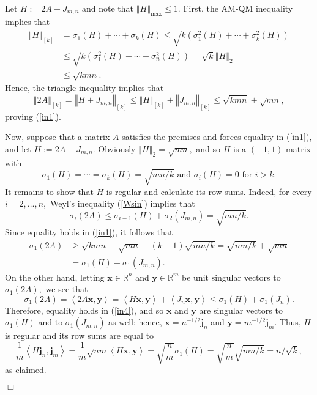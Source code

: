 \documentclass[12pt]{article}%
\newenvironment{proof}[1][Proof]{\noindent{\textbf {#1}  }}  {\hfill$\Box$\bigskip}
\begin{document}
\begin{proof}
Let $H:=2A-J_{m,n}$ and note that $\left\Vert H\right\Vert _{\max}\leq1$.
First, the AM-QM inequality implies that
\begin{align*}
\left\Vert H\right\Vert _{\left[  k\right]  }  &  =\sigma_{1}\left(  H\right)
+\cdots+\sigma_{k}\left(  H\right)  \leq\sqrt{k\left(  \sigma_{1}^{2}\left(
H\right)  +\cdots+\sigma_{k}^{2}\left(  H\right)  \right)  }\\
&  \leq\sqrt{k\left(  \sigma_{1}^{2}\left(  H\right)  +\cdots+\sigma_{n}%
^{2}\left(  H\right)  \right)  }=\sqrt{k}\left\Vert H\right\Vert _{2}\\
&  \leq\sqrt{kmn}.
\end{align*}
Hence, the triangle inequality implies that%
\[
\left\Vert 2A\right\Vert _{\left[  k\right]  }=\left\Vert H+J_{m,n}\right\Vert
_{\left[  k\right]  }\leq\left\Vert H\right\Vert _{\left[  k\right]
}+\left\Vert J_{m,n}\right\Vert _{\left[  k\right]  }\leq\sqrt{kmn}+\sqrt
{mn},
\]
proving (\ref{in1}).

Now, suppose that a matrix $A$ satisfies the premises and forces equality in
(\ref{in1}), and let $H:=2A-J_{m,n}.$ Obviously $\left\Vert H\right\Vert
_{2}=\sqrt{mn},$ and so $H$ is a $\left(  -1,1\right)  $-matrix with
\[
\sigma_{1}\left(  H\right)  =\cdots=\sigma_{k}\left(  H\right)  =\sqrt
{mn/k}\text{ \ \ and \ \ }\sigma_{i}\left(  H\right)  =0\text{ \ \ for
\ }i>k.
\]
It remains to show that $H$ is regular and calculate its row sums. Indeed, for
every $i=2,\ldots,n,$ Weyl's inequality (\ref{Wsin}) implies that
\[
\sigma_{i}\left(  2A\right)  \leq\sigma_{i-1}\left(  H\right)  +\sigma
_{2}\left(  J_{m,n}\right)  =\sqrt{mn/k}.
\]
Since equality holds in (\ref{in1}), it follows that
\begin{align*}
\sigma_{1}\left(  2A\right)   &  \geq\sqrt{kmn}+\sqrt{mn}-\left(  k-1\right)
\sqrt{mn/k}=\sqrt{mn/k}+\sqrt{mn}\\
&  =\sigma_{1}\left(  H\right)  +\sigma_{1}\left(  J_{m,n}\right)  .
\end{align*}
On the other hand, letting $\mathbf{x}\in\mathbb{R}^{n}$ and $\mathbf{y}%
\in\mathbb{R}^{m}$ be unit singular vectors to $\sigma_{1}\left(  2A\right)
,$ we see that
\begin{equation}
\sigma_{1}\left(  2A\right)  =\left\langle 2A\mathbf{x},\mathbf{y}%
\right\rangle =\left\langle H\mathbf{x},\mathbf{y}\right\rangle +\left\langle
J_{n}\mathbf{x},\mathbf{y}\right\rangle \leq\sigma_{1}\left(  H\right)
+\sigma_{1}\left(  J_{n}\right)  . \label{in4}%
\end{equation}
Therefore, equality holds in (\ref{in4}), and so $\mathbf{x}$ and $\mathbf{y}$
are singular vectors to $\sigma_{1}\left(  H\right)  $ and to $\sigma
_{1}\left(  J_{m,n}\right)  $ as well; hence, $\mathbf{x}=n^{-1/2}%
\mathbf{j}_{n}$ and $\mathbf{y}=m^{-1/2}\mathbf{j}_{m}.$ Thus, $H$ is regular
and its row sums are equal to
\[
\frac{1}{m}\left\langle H\mathbf{j}_{n},\mathbf{j}_{m}\right\rangle =\frac
{1}{m}\sqrt{nm}\left\langle H\mathbf{x},\mathbf{y}\right\rangle =\sqrt
{\frac{n}{m}}\sigma_{1}\left(  H\right)  =\sqrt{\frac{n}{m}}\sqrt
{mn/k}=n/\sqrt{k},
\]
as claimed.


\end{proof}
\end{document}
